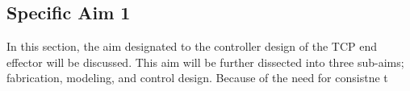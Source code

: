 \subsection{Specific Aim 1}
\label{sect:aim1}

In this section, the aim designated to the controller design of the TCP end effector will be discussed. This aim will be further dissected into three sub-aims; fabrication, modeling, and control design. Because of the need for consistne t